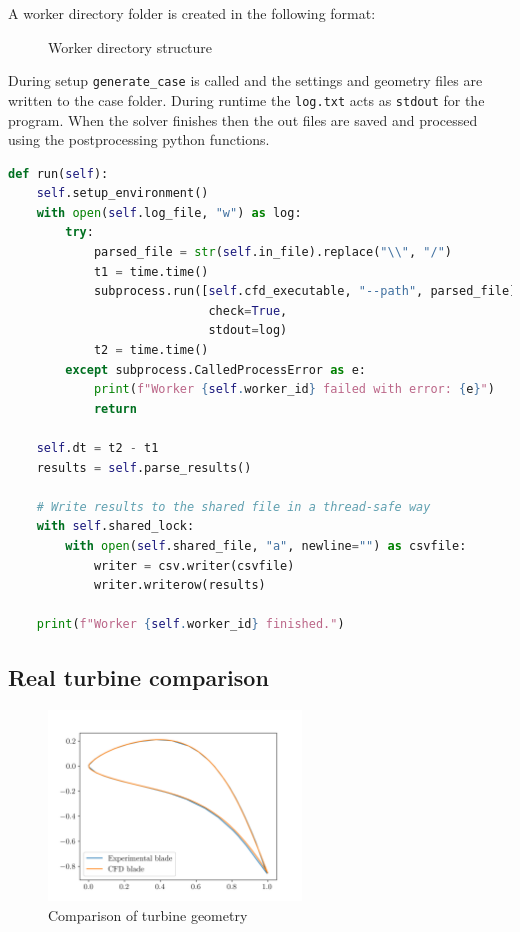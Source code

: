 \documentclass{article}
\begin{document}
A worker directory folder is created in the following format:
\begin{figure}[H]
    \caption{Worker directory structure}
    \label{fig:worker_dir}
\end{figure}

During setup \texttt{generate\_case} is called and the settings and geometry files are written to the case folder.
During runtime the \texttt{log.txt} acts as \texttt{stdout} for the program.
When the solver finishes then the out files are saved and processed using the postprocessing python functions.

\begin{lstlisting}[language=Python]
def run(self):
    self.setup_environment()
    with open(self.log_file, "w") as log:
        try:
            parsed_file = str(self.in_file).replace("\\", "/")
            t1 = time.time()
            subprocess.run([self.cfd_executable, "--path", parsed_file],
                            check=True,
                            stdout=log)
            t2 = time.time()
        except subprocess.CalledProcessError as e:
            print(f"Worker {self.worker_id} failed with error: {e}")
            return

    self.dt = t2 - t1
    results = self.parse_results()

    # Write results to the shared file in a thread-safe way
    with self.shared_lock:
        with open(self.shared_file, "a", newline="") as csvfile:
            writer = csv.writer(csvfile)
            writer.writerow(results)

    print(f"Worker {self.worker_id} finished.")
\end{lstlisting}

\subsection{Real turbine comparison}

\begin{figure}[H]
    \centering
    \includegraphics[width=0.6\textwidth]{figures/turbine_geometry.png}
    \caption{Comparison of turbine geometry}
    \label{fig:turbine_geometry}
\end{figure}
\end{document}
